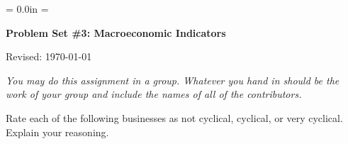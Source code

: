 \documentclass[12pt]{exam}
\def\HeadName{Problem Set \#3}
\begin{document}
\parindent = 0.0in
\parskip = \bigskipamount
\thispagestyle{empty}%
\Head

\centerline{\large \bf \HeadName: Macroeconomic Indicators}
\centerline{Revised:  \today}

\medskip
{\it You may do this assignment in a group.
Whatever you hand in should be the work of your group
and include the names of all of the contributors.}

\begin{questions}
Rate each of the following businesses
as not cyclical, cyclical, or very cyclical.
Explain your reasoning.

\begin{solution}
\end{solution}


\end{questions}
\end{document}
